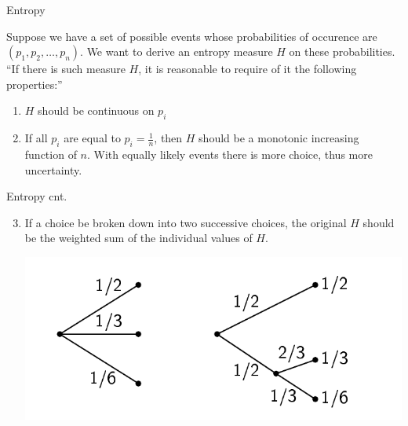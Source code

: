 \documentclass{beamer}
\begin{document}
\begin{frame}{Entropy}
    \begin{definition}[Entropy]
        Suppose we have a set of possible events whose probabilities of occurence are
        $(p_1, p_2, \ldots, p_n)$. We want to derive an entropy measure $H$ on 
        these probabilities. \\
        ``If there is such measure $H$, it is reasonable to require of it the 
        following properties:''
        \begin{enumerate}
            \item $H$ should be continuous on $p_i$
            \item If all $p_i$ are equal to $p_i = \frac{1}{n}$, then $H$ should
            be a monotonic increasing function of $n$. With equally likely events
            there is more choice, thus more uncertainty.
        \end{enumerate} 
    \end{definition}
\end{frame}

\begin{frame}{Entropy cnt.}
    \begin{definition}
        \begin{enumerate}
            \setcounter{enumi}{2}
            \item  If a choice be broken down into two successive choices, the 
            original $H$ should be the weighted sum of the individual values of $H$.
            
            \includegraphics[scale=0.3]{Third_property.png}
        \end{enumerate}
    \end{definition}

\end{frame}
\end{document}
